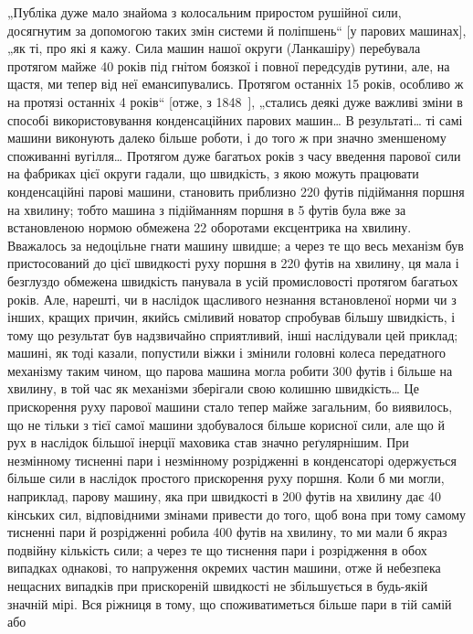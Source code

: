 „Публіка дуже мало знайома з колосальним приростом рушійної сили, досягнутим за допомогою таких змін
системи й поліпшень“ [у парових машинах], „як ті, про які я кажу. Сила машин нашої округи
(Ланкашіру) перебувала протягом майже 40 років
під гнітом боязкої і повної передсудів рутини, але, на щастя,
ми тепер від неї емансипувались. Протягом останніх 15 років,
особливо ж на протязі останніх 4 років“ [отже, з 1848~], „стались деякі дуже важливі зміни в
способі використовування конденсаційних парових машин\dots{} В результаті\dots{} ті самі машини виконують
далеко більше роботи, і до того ж при значно зменшеному споживанні вугілля\dots{} Протягом дуже багатьох
років
з часу введення парової сили на фабриках цієї округи гадали,
що швидкість, з якою можуть працювати конденсаційні парові
машини, становить приблизно 220 футів підіймання поршня на
хвилину; тобто машина з підійманням поршня в 5 футів була вже
за встановленою нормою обмежена 22 оборотами ексцентрика на
хвилину. Вважалось за недоцільне гнати машину швидше; а через
те що весь механізм був пристосований до цієї швидкості руху
поршня в 220 футів на хвилину, ця мала і безглуздо обмежена
швидкість панувала в усій промисловості протягом багатьох років.
Але, нарешті, чи в наслідок щасливого незнання встановленої норми
чи з інших, кращих причин, якийсь сміливий новатор спробував
більшу швидкість, і тому що результат був надзвичайно сприятливий, інші наслідували цей приклад;
машині, як тоді казали, попустили віжки і змінили головні колеса передатного механізму таким
чином, що парова машина могла робити 300 футів і більше на
хвилину, в той час як механізми зберігали свою колишню швидкість\dots{} Це прискорення руху парової
машини стало тепер майже
загальним, бо виявилось, що не тільки з тієї самої машини здобувалося більше корисної сили, але що й
рух в наслідок більшої
інерції маховика став значно реґулярнішим. При незмінному
тисненні пари і незмінному розрідженні в конденсаторі одержується більше сили в наслідок простого
прискорення руху
поршня. Коли б ми могли, наприклад, парову машину, яка при
швидкості в 200 футів на хвилину дає 40 кінських сил, відповідними змінами привести до того, щоб
вона при тому самому тисненні
пари й розрідженні робила 400 футів на хвилину, то ми мали б
якраз подвійну кількість сили; а через те що тиснення пари
і розрідження в обох випадках однакові, то напруження окремих
частин машини, отже й небезпека нещасних випадків при прискореній швидкості не збільшується в
будь-якій значній мірі. Вся ріжниця в тому, що споживатиметься більше пари в тій самій або
